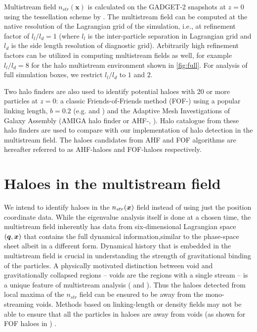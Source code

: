 \documentclass[fleqn,usenatbib,useAMS]{mnras}
\begin{document}
Multistream field $n_{str}(\mathbf{x})$ is calculated on the GADGET-2 snapshots at $z=0$ using the tessellation scheme by \cite{Shandarin2012}. The multistream field can be computed at the native resolution of the Lagrangian grid of the simulation, i.e., at refinement factor of $l_l/l_d = 1$ (where $l_l$ is the inter-particle separation in Lagrangian grid and $l_d$ is the side length resolution of diagnostic grid). Arbitrarily high refinement factors can be utilized in computing multistream fields as well, for example  $l_l/l_d = 8$ for the halo multistream environment shown in \autoref{fig:full}. For analysis of full simulation boxes, we restrict $l_l/l_d$ to $1$ and $2$. 

Two halo finders are also used to identify potential haloes with 20 or more particles at $z= 0$: a classic Friends-of-Friends method (FOF-\citealt{Davis1985}) using a popular linking length, $ b= 0.2$ (e.g. \citealt{Frenk1988} and \citealt{Lacey1994}) and the Adaptive Mesh Investigations of Galaxy Assembly (AMIGA halo finder or AHF-\citealt{Knollmann2009a}, \citealt{Gill2004a}). Halo catalogue from these halo finders are used to compare with our implementation of halo detection in the multistream field. The haloes candidates from AHF and FOF algorithms are hereafter referred to as AHF-haloes and FOF-haloes respectively.




\section{Haloes in the multistream field}
\label{sec:haloDetection}

We intend to identify haloes in the $n_{str}(\bmath{x})$ field instead of using just the position coordinate data. While the eigenvalue analysis itself is done at a chosen time, the multistream field inherently has data from six-dimensional Lagrangian space $(\bmath{q}, \bmath{x})$ that contains the full dynamical information,similar to the phase-space sheet albeit in a different form. Dynamical history that is embedded in the multistream field is crucial in understanding the strength of gravitational binding of the particles. 
A physically motivated distinction between void and gravitationally collapsed regions -- voids are the regions with a single stream -- is a unique feature of multistream analysis (\citealt{Shandarin2012} and \citealt{Ramachandra2017}). Thus the haloes detected from local maxima of the $n_{str}$ field can be ensured to be away from the mono-streaming voids. Methods based on linking-length or density fields may not be able to ensure that  all the particles in haloes are away from voids (as shown for FOF haloes in \citealt{Ramachandra2017}) . 
\end{document}
